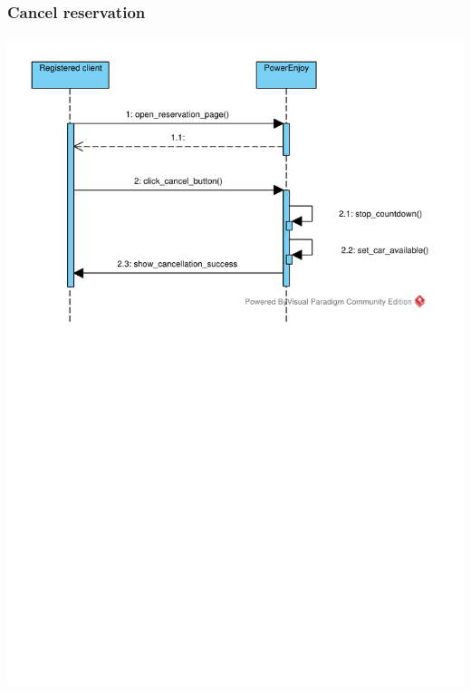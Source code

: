 \subsubsection{Cancel reservation}
\includegraphics[width=\textwidth, keepaspectratio]{../images/diagram/sequence/cancel_reservation.pdf}


